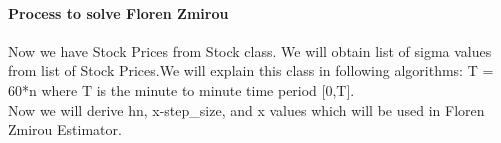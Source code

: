\begin{enumerate}
\paragraph{Process to solve Floren Zmirou}
Now we have Stock Prices from Stock class. We will obtain list of sigma values from list of Stock Prices.We will explain this class in following algorithms:\newline
T = 60*n where T is the minute to minute time period [0,T].\\
Now we will derive hn, x-step\_size, and x values which will be used in Floren Zmirou Estimator.

\end{enumerate}
